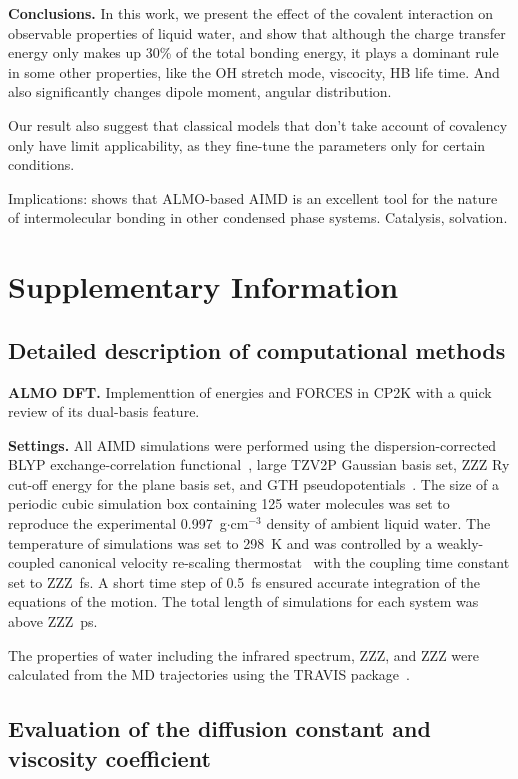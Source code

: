 \documentclass[prl,twocolumn,showpacs]{revtex4}
\begin{document}
\textbf{Conclusions.} In this work, we present the effect of the covalent interaction on observable properties of liquid water, and show that although the charge transfer energy only makes up 30\% of the total bonding energy, it plays a dominant rule in some other properties, like the OH stretch mode, viscocity, HB life time. And also significantly changes dipole moment, angular distribution. 
 
Our result also suggest that classical models that don't take account of covalency only have limit applicability, as they fine-tune the parameters only for certain conditions.
 
Implications: shows that ALMO-based AIMD is an excellent tool for the nature of intermolecular bonding in other condensed phase systems. Catalysis, solvation.

\section{Supplementary Information}

\subsection{Detailed description of computational methods}

\textbf{ALMO DFT.} Implementtion of energies and FORCES in CP2K with a quick review of its dual-basis feature.

\textbf{Settings.} All AIMD simulations were performed using the dispersion-corrected~\cite{ZZZ} BLYP exchange-correlation functional~\cite{ZZZ}, large TZV2P Gaussian basis set, ZZZ Ry cut-off energy for the plane basis set, and GTH pseudopotentials~\cite{ZZZ}. The size of a periodic cubic simulation box containing 125 water molecules was set to reproduce the experimental 0.997~g$\cdot$cm$^{-3}$ density of ambient liquid water. The temperature of simulations was set to 298~K and was controlled by a weakly-coupled canonical velocity re-scaling thermostat~\cite{ZZZ} with the coupling time constant set to ZZZ~fs. A short time step of 0.5~fs ensured accurate integration of the equations of the motion. The total length of simulations for each system was above ZZZ~ps.

The properties of water including the infrared spectrum, ZZZ, and ZZZ were calculated from the MD trajectories using the TRAVIS package~\cite{brehm2012travis}.  

\subsection{Evaluation of the diffusion constant and viscosity coefficient} 
\end{document}

